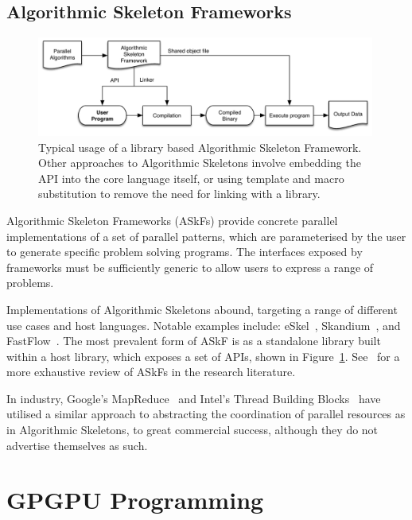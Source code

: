 \subsection{Algorithmic Skeleton Frameworks}

\begin{figure}
\centering
\includegraphics[width=0.99\textwidth]{img/askf}
\caption[Overview of an Algorithmic Skeleton Framework]{%
  Typical usage of a library based Algorithmic Skeleton
  Framework. Other approaches to Algorithmic Skeletons involve
  embedding the API into the core language itself, or using template
  and macro substitution to remove the need for linking with a
  library.%
}
\label{fig:askf}
\end{figure}

Algorithmic Skeleton Frameworks (ASkFs) provide concrete parallel
implementations of a set of parallel patterns, which are parameterised
by the user to generate specific problem solving programs. The
interfaces exposed by frameworks must be sufficiently generic to allow
users to express a range of problems.

Implementations of Algorithmic Skeletons abound, targeting a range of
different use cases and host languages. Notable examples include:
eSkel~\cite{Benoit2005a}, Skandium~\cite{Leyton2010}, and
FastFlow~\cite{Aldinucci2011}. The most prevalent form of ASkF is as a
standalone library built within a host library, which exposes a set of
APIs, shown in Figure~\ref{fig:askf}. See~\cite{Gonzalez2010} for a
more exhaustive review of ASkFs in the research literature.

In industry, Google's MapReduce~\cite{Dean2008} and Intel's Thread
Building Blocks~\cite{IntelTBB} have utilised a similar approach to
abstracting the coordination of parallel resources as in Algorithmic
Skeletons, to great commercial success, although they do not advertise
themselves as such.


\section{GPGPU Programming}\label{sec:gpgpu}

